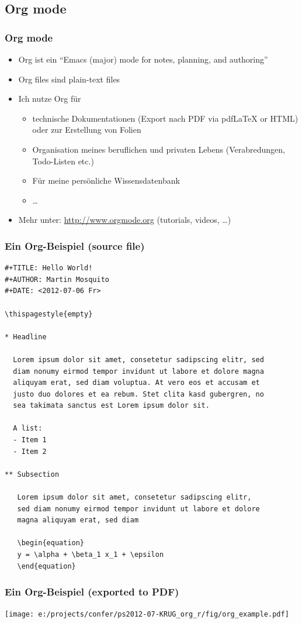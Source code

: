 \documentclass[bigger]{beamer}
\begin{document}
\subsection{Org mode}
\label{sec-2-3}
\begin{frame}
\frametitle{Org mode}
\label{sec-2-3-1}

\begin{itemize}
\item Org ist ein \enquote{Emacs (major) mode for notes, planning, and authoring}
\item Org files sind plain-text files
\item Ich nutze Org für
\begin{itemize}
\item technische Dokumentationen (Export nach PDF via pdfLaTeX or HTML) oder zur
    Erstellung von Folien
\item Organisation meines beruflichen und privaten Lebens (Verabredungen,
    Todo-Listen etc.)
\item Für meine persönliche Wissensdatenbank
\item \ldots{}
\end{itemize}
\item Mehr unter: \href{http://www.orgmode.org}{http://www.orgmode.org} (tutorials, videos, \ldots{})
\end{itemize}
\end{frame}
\begin{frame}[fragile,shrink = 25]
\frametitle{Ein Org-Beispiel (source file)}
\label{sec-2-3-2}



\lstset{language=org}
\begin{lstlisting}
#+TITLE: Hello World!
#+AUTHOR: Martin Mosquito
#+DATE: <2012-07-06 Fr>

\thispagestyle{empty}

* Headline

  Lorem ipsum dolor sit amet, consetetur sadipscing elitr, sed 
  diam nonumy eirmod tempor invidunt ut labore et dolore magna 
  aliquyam erat, sed diam voluptua. At vero eos et accusam et 
  justo duo dolores et ea rebum. Stet clita kasd gubergren, no 
  sea takimata sanctus est Lorem ipsum dolor sit. 

  A list:
  - Item 1
  - Item 2  

** Subsection 

   Lorem ipsum dolor sit amet, consetetur sadipscing elitr, 
   sed diam nonumy eirmod tempor invidunt ut labore et dolore 
   magna aliquyam erat, sed diam
   
   \begin{equation}
   y = \alpha + \beta_1 x_1 + \epsilon
   \end{equation}
\end{lstlisting}
\end{frame}
\begin{frame}
\frametitle{Ein Org-Beispiel (exported to PDF)}
\label{sec-2-3-3}


\texttt{[image: e:/projects/confer/ps2012-07-KRUG\_org\_r/fig/org\_example.pdf]}
\end{frame}
\end{document}
